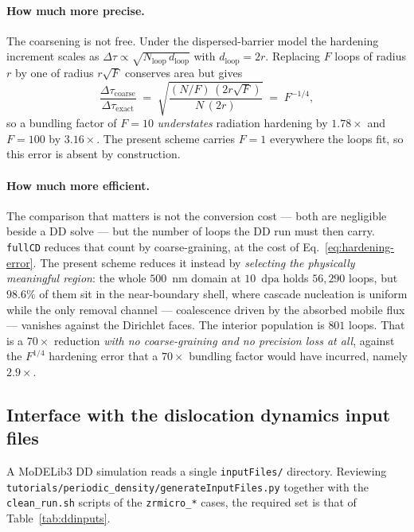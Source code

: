 \documentclass[11pt,a4paper]{article}
\newcommand{\code}[1]{\texttt{\small #1}}
\newcommand{\dpa}{\ensuremath{\mathrm{dpa}}}
\begin{document}
\paragraph{How much more precise.} The coarsening is not free. Under the
dispersed-barrier model the hardening increment scales as
$\Delta\tau \propto \sqrt{N_{\text{loop}}\,d_{\text{loop}}}$ with
$d_{\text{loop}}=2r$. Replacing $F$ loops of radius $r$ by one of radius
$r\sqrt{F}$ conserves area but gives
\begin{equation}
  \frac{\Delta\tau_{\text{coarse}}}{\Delta\tau_{\text{exact}}}
  \;=\;
  \sqrt{\frac{(N/F)\,(2r\sqrt{F})}{N\,(2r)}}
  \;=\; F^{-1/4} ,
  \label{eq:hardening-error}
\end{equation}
so a bundling factor of $F=10$ \emph{understates} radiation hardening by
$1.78\times$ and $F=100$ by $3.16\times$. The present scheme carries $F=1$
everywhere the loops fit, so this error is absent by construction.

\paragraph{How much more efficient.} The comparison that matters is not the
conversion cost --- both are negligible beside a DD solve --- but the number of
loops the DD run must then carry. \code{fullCD} reduces that count by
coarse-graining, at the cost of Eq.~\eqref{eq:hardening-error}. The present
scheme reduces it instead by \emph{selecting the physically meaningful region}:
the whole $500$~nm domain at $10$~\dpa{} holds $56{,}290$ loops, but $98.6\%$ of
them sit in the near-boundary shell, where cascade nucleation is uniform while
the only removal channel --- coalescence driven by the absorbed mobile flux ---
vanishes against the Dirichlet faces. The interior population is $801$ loops.
That is a $70\times$ reduction \emph{with no coarse-graining and no precision
loss at all}, against the $F^{1/4}$ hardening error that a $70\times$ bundling
factor would have incurred, namely $2.9\times$.

\subsection{Interface with the dislocation dynamics input files}

A MoDELib3 DD simulation reads a single \code{inputFiles/} directory. Reviewing
\code{tutorials/periodic\_density/generateInputFiles.py} together with the
\code{clean\_run.sh} scripts of the \code{zrmicro\_*} cases, the required set is
that of Table~\ref{tab:ddinputs}.
\end{document}

